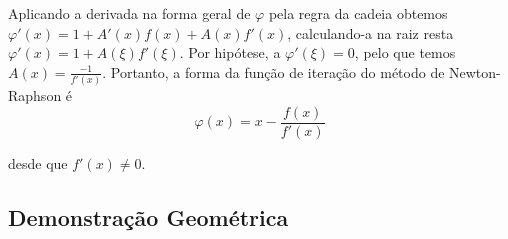 Aplicando a derivada na forma geral de $\varphi$ pela regra da cadeia obtemos $\varphi'(x) = 1 + A'(x)f(x) + A(x)f'(x)$, calculando-a na raiz resta $\varphi'(x) = 1 + A(\xi)f'(\xi)$. Por hipótese, a $\varphi'(\xi) = 0$, pelo que temos $A(x) = \frac{-1}{f'(x)}$. Portanto, a forma da função de iteração do método de Newton-Raphson é 
\begin{equation*}
    \varphi(x) = x - \frac{f(x)}{f'(x)}
\end{equation*}

desde que $f'(x) \neq 0$.

\subsection{Demonstração Geométrica}
